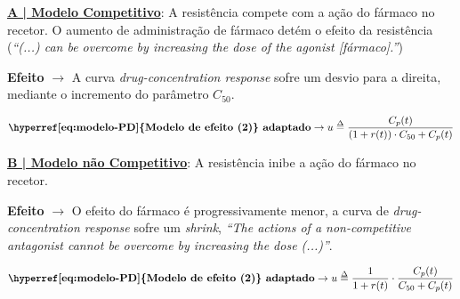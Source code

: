  \hyperref[fig:LABEL-competitive]{\textbf{A | Modelo Competitivo}}: A resistência compete com a ação do fármaco no recetor. O aumento de administração de fármaco detém o efeito da resistência (\textit{``(...) can be overcome by increasing the dose of the agonist [fármaco].''}\cite{10.1093/bjaceaccp/mkh049})
 
 \hspace*{1.25 em}\raisebox{0.2 em}{$\drsh$} \textbf{Efeito} $\rightarrow$ A curva \textit{drug-concentration response} sofre um desvio para a direita, mediante o incremento do parâmetro $C_{50}$.\footnotemark[9]

\begin{equation}
    \textbf{\hyperref[eq:modelo-PD]{Modelo de efeito (2)} adaptado} \rightarrow u \delequal \frac{C_p(t)}{(1 + r(t))\cdot C_{50} + C_p(t)}
\end{equation}

\hyperref[fig:LABEL-ncompetitive]{\textbf{B | Modelo não Competitivo}}: A resistência inibe a ação do fármaco no recetor. 
 
 \hspace*{1.25 em}\raisebox{0.2 em}{$\drsh$} \textbf{Efeito} $\rightarrow$ O efeito do fármaco é progressivamente menor, a curva de \textit{drug-concentration response} sofre um \textit{shrink}, \textit{``The actions of a non-competitive antagonist cannot be overcome by increasing the dose (...)''}.\cite{10.1093/bjaceaccp/mkh049}
 
\begin{equation}
    \textbf{\hyperref[eq:modelo-PD]{Modelo de efeito (2)} adaptado} \rightarrow u \delequal \frac{1}{1 + r(t)}\cdot\frac{C_p(t)}{C_{50} + C_p(t)}
\end{equation}

